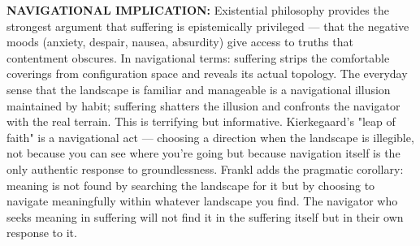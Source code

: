 \textbf{NAVIGATIONAL IMPLICATION:} Existential philosophy provides the strongest argument that suffering is epistemically privileged — that the negative moods (anxiety, despair, nausea, absurdity) give access to truths that contentment obscures. In navigational terms: suffering strips the comfortable coverings from configuration space and reveals its actual topology. The everyday sense that the landscape is familiar and manageable is a navigational illusion maintained by habit; suffering shatters the illusion and confronts the navigator with the real terrain. This is terrifying but informative. Kierkegaard's "leap of faith" is a navigational act — choosing a direction when the landscape is illegible, not because you can see where you're going but because navigation itself is the only authentic response to groundlessness. Frankl adds the pragmatic corollary: meaning is not found by searching the landscape for it but by choosing to navigate meaningfully within whatever landscape you find. The navigator who seeks meaning in suffering will not find it in the suffering itself but in their own response to it.


\bigskip\noindent\makebox[\textwidth]{\color{rulegray}\rule{5cm}{0.3pt}}\bigskip
